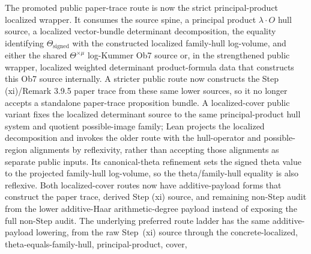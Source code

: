 \begin{proposition}
  \leanok
  The promoted public paper-trace route is now the strict principal-product
  localized wrapper.  It consumes the source spine, a principal product
  \(\lambda\cdot O\) hull source, a localized vector-bundle determinant
  decomposition, the equality identifying \(\Theta_{\mathrm{signed}}\) with
  the constructed localized family-hull log-volume, and either the shared
  \(\Theta^{\times\mu}\) log-Kummer Ob7 source or, in the strengthened public
  wrapper, localized weighted determinant product-formula data that constructs
  this Ob7 source internally.  A stricter public route now constructs the
  Step (xi)/Remark 3.9.5 paper trace from these same lower sources, so it no
  longer accepts a standalone paper-trace proposition bundle.  A localized-cover
  public variant fixes the localized determinant source to the same
  principal-product hull system and quotient possible-image family; Lean
  projects the localized decomposition and invokes the older route with the
  hull-operator and possible-region alignments by reflexivity, rather than
  accepting those alignments as separate public inputs.  Its canonical-theta
  refinement sets the signed theta value to the projected family-hull
  log-volume, so the theta/family-hull equality is also reflexive.  Both
  localized-cover routes now have additive-payload forms that construct the
  paper trace, derived Step (xi) source, and remaining non-Step audit from the
  lower additive-Haar arithmetic-degree payload instead of exposing the full
  non-Step audit.  The underlying preferred route ladder has the same
  additive-payload lowering, from the raw Step~(xi) source through the
  concrete-localized, theta-equals-family-hull, principal-product, cover,

\end{proposition}
